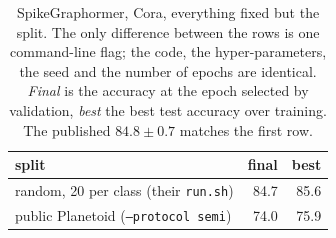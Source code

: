 \begin{table}[t]
\centering
\footnotesize
\caption{SpikeGraphormer, Cora, everything fixed but the split. The only difference between the rows is one command-line flag; the code, the hyper-parameters, the seed and the number of epochs are identical. \emph{Final} is the accuracy at the epoch selected by validation, \emph{best} the best test accuracy over training. The published $84.8\pm0.7$ matches the first row.}\label{tab:split}
\begin{tabular}{lrr}
\toprule
split & final & best \\
\midrule
random, 20 per class (their \texttt{run.sh}) & 84.7 & 85.6 \\
public Planetoid (\texttt{--protocol semi}) & 74.0 & 75.9 \\
\bottomrule
\end{tabular}
\end{table}
